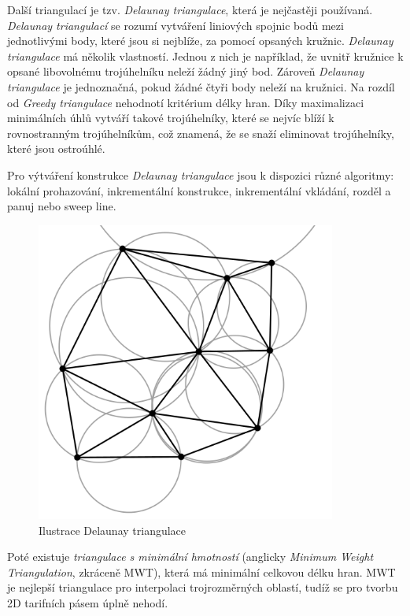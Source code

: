 Další triangulací je tzv. \textit{Delaunay triangulace}, která je nejčastěji používaná.
\textit{Delaunay triangulací} se rozumí vytváření liniových spojnic bodů mezi jednotlivými body, které jsou si nejblíže,
za pomocí opsaných kružnic. \textit{Delaunay triangulace} má několik vlastností. Jednou z nich je například,
že uvnitř kružnice k opsané libovolnému trojúhelníku neleží žádný jiný bod.
Zároveň \textit{Delaunay triangulace} je jednoznačná, pokud žádné čtyři body neleží na kružnici.
Na rozdíl od \textit{Greedy triangulace} nehodnotí kritérium délky hran. Díky maximalizaci minimálních
úhlů vytváří takové trojúhelníky, které se nejvíc blíží k rovnostranným trojúhelníkům, 
což znamená, že se snaží eliminovat trojúhelníky, které jsou ostroúhlé.

Pro výtváření konstrukce \textit{Delaunay triangulace} jsou k dispozici různé algoritmy: lokální prohazování, 
inkrementální konstrukce, inkrementální vkládání, rozděl a panuj nebo sweep line. \cite{bayer-delaunay}

\begin{figure}[H] \centering
    \includegraphics[width=280pt]{./pictures/triangulace-delaunay.png}
    \caption[Ilustrace Delaunay triangulace]{Ilustrace Delaunay triangulace \cite{triangulace-delaunay}}
	\label{fig:triangulace-delaunay}              
\end{figure}

Poté existuje \textit{triangulace s minimální hmotností} (anglicky \textit{Minimum Weight Triangulation}, zkráceně MWT),
která má minimální celkovou délku hran. MWT je nejlepší triangulace pro interpolaci trojrozměrných oblastí,
tudíž se pro tvorbu 2D tarifních pásem úplně nehodí.

